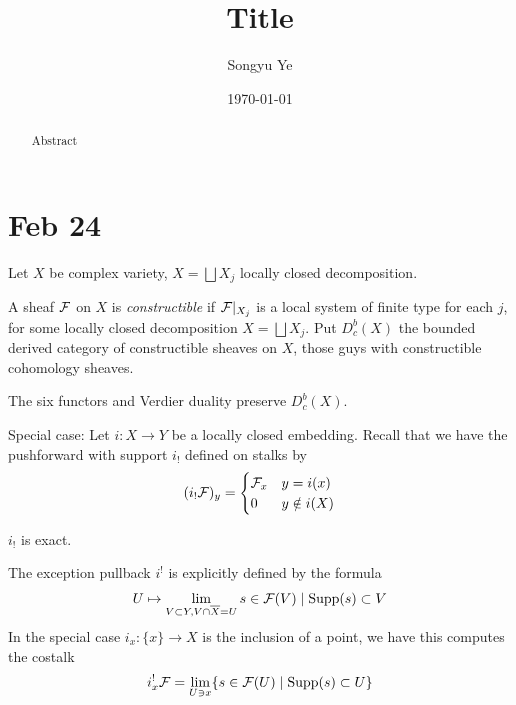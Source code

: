 \documentclass[12pt]{article}
\begin{document}
\rhead{\today}
\cfoot{\thepage}

\title{Title}
\author{Songyu Ye}
\date{\today}
\maketitle

\begin{abstract}
    Abstract
\end{abstract}

\tableofcontents

\section{Feb 24}
Let $X$ be complex variety, $X = \bigsqcup X_j$ locally closed decomposition.
\begin{definition}
    A sheaf ${\mathcal{F}}$ on $X$ is \emph{constructible} if ${\mathcal{F}}|_{X_j}$ is a local system of finite type for each $j$, for some locally closed decomposition $X = \bigsqcup X_j$. Put $D^b_c(X)$ the bounded derived category of constructible sheaves on $X$, those guys with constructible cohomology sheaves.
\end{definition}

\begin{theorem}
    The six functors and Verdier duality preserve $D^b_c(X)$.
\end{theorem}

Special case:
Let $i:X\to Y$ be a locally closed embedding. Recall that we have the pushforward with support $i_!$ defined on stalks by \begin{align*}
(i_!{\mathcal{F}})_y = \begin{cases}
    {\mathcal{F}}_x & y = i(x)\\
    0 & y\notin i(X)
\end{cases}
\end{align*}
\begin{proposition}
    $i_!$ is exact.
\end{proposition}
 
\begin{definition}
    The exception pullback $i^!$ is explicitly defined by the formula
\begin{align*}
    U \mapsto \lim_{V \subset Y, V\cap \overline{X}=U} {s\in {\mathcal{F}}(V) \mid \mathrm{Supp}(s) \subset V}
\end{align*}
In the special case $i_x:\{x\}\to X$ is the inclusion of a point, we have this computes the costalk
\begin{align*}
i_x^!{\mathcal{F}} = \lim_{U\ni x} \{s\in {\mathcal{F}}(U) \mid \mathrm{Supp}(s) \subset U\}
\end{align*}
\end{definition}
\end{document}
